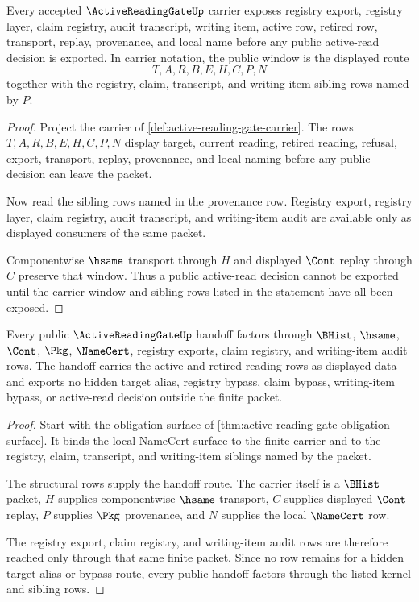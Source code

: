 \begin{theorem}
\label{thm:active-reading-gate-obligation-carrier-window}
Every accepted $\ActiveReadingGateUp$ carrier exposes registry export, registry layer, claim registry, audit transcript, writing item, active row, retired row, transport, replay, provenance, and local name before any public active-read decision is exported. In carrier notation, the public window is the displayed route
$$
T,A,R,B,E,H,C,P,N
$$
together with the registry, claim, transcript, and writing-item sibling rows named by $P$.
\end{theorem}
\begin{proof}
Project the carrier of \autoref{def:active-reading-gate-carrier}. The rows $T,A,R,B,E,H,C,P,N$ display target, current reading, retired reading, refusal, export, transport, replay, provenance, and local naming before any public decision can leave the packet.

Now read the sibling rows named in the provenance row. Registry export, registry layer, claim registry, audit transcript, and writing-item audit are available only as displayed consumers of the same packet.

Componentwise $\hsame$ transport through $H$ and displayed $\Cont$ replay through $C$ preserve that window. Thus a public active-read decision cannot be exported until the carrier window and sibling rows listed in the statement have all been exposed.
\end{proof}

\begin{theorem}
\label{thm:active-reading-gate-scope-handoff}
Every public $\ActiveReadingGateUp$ handoff factors through $\BHist$, $\hsame$, $\Cont$, $\Pkg$, $\NameCert$, registry exports, claim registry, and writing-item audit rows. The handoff carries the active and retired reading rows as displayed data and exports no hidden target alias, registry bypass, claim bypass, writing-item bypass, or active-read decision outside the finite packet.
\end{theorem}
\begin{proof}
Start with the obligation surface of \autoref{thm:active-reading-gate-obligation-surface}. It binds the local NameCert surface to the finite carrier and to the registry, claim, transcript, and writing-item siblings named by the packet.

The structural rows supply the handoff route. The carrier itself is a $\BHist$ packet, $H$ supplies componentwise $\hsame$ transport, $C$ supplies displayed $\Cont$ replay, $P$ supplies $\Pkg$ provenance, and $N$ supplies the local $\NameCert$ row.

The registry export, claim registry, and writing-item audit rows are therefore reached only through that same finite packet. Since no row remains for a hidden target alias or bypass route, every public handoff factors through the listed kernel and sibling rows.
\end{proof}

